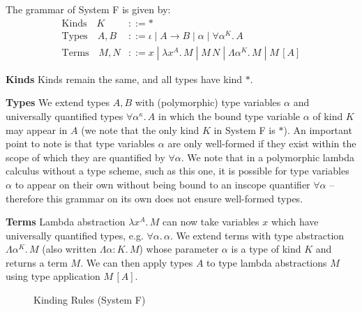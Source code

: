\documentclass[acmsmall, 9pt]{article}
\begin{document}
\lbreak
The grammar of System F is given by:
\begin{align*}
  \text{Kinds} \quad K &::= * \\
  \text{Types} \quad  A, B &::= \iota \; | \; A \rightarrow B \; | \; \alpha \; | \; \forall \alpha^K. \, A  \\
  \text{Terms} \quad M, N &::= x \; | \; \lambda x^A . \, M \; | \; M \, N  \; | \; \Lambda \alpha^K . \, M \; | \; M \, [A]
\end{align*}

\noindent
\textbf{Kinds} Kinds remain the same, and all types have kind $*$.

\noindent
\textbf{Types} We extend types $A, B$ with (polymorphic) type variables $\alpha$ and universally quantified types $\forall \alpha^{\kappa}. \, A$ in which the bound type variable $\alpha$ of kind $K$ may appear in $A$ (we note that the only kind $K$ in System F is $*$). An important point to note is that type variables $\alpha$ are only well-formed if they exist within the scope of which they are quantified by $\forall \alpha$. We note that in a polymorphic lambda calculus without a type scheme, such as this one, it is possible for type variables $\alpha$ to appear on their own without being bound to an inscope quantifier $\forall \alpha$ -- therefore this grammar on its own does not ensure well-formed types.

\noindent
\textbf{Terms} Lambda abstraction $\lambda x^A . \, M$ can now take variables $x$ which have universally quantified types, e.g. $\forall \alpha. \, \alpha$. We extend terms with type abstraction $\Lambda \alpha^K . \, M$ (also written $\Lambda \alpha : K . \, M$) whose parameter $\alpha$ is a type of kind $K$ and returns a term $M$. We can then apply types $A$ to type lambda abstractions $M$ using type application $M \, [A]$.

\begin{figure}[H]
\flushleft {}
\caption{Kinding Rules (System F)}
\end{figure}
\end{document}
